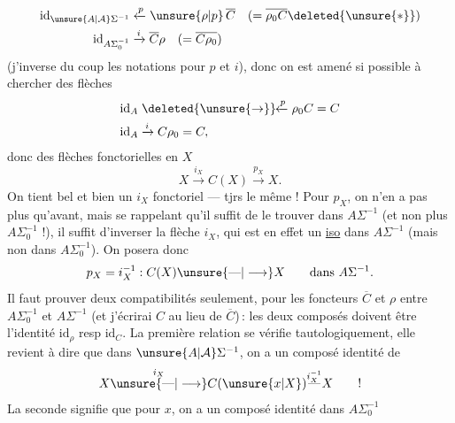 \[
 \begin{aligned}
 \mathrm{id}_{\unsure{A|\mathcal A}\Sigma^{-1}}&\xleftarrow{p}\unsure{\rho|p}\,\overline C\quad(=\overline{\rho_0 C}\deleted{\unsure{*}})\\
 \mathrm{id}_{A\Sigma_0^{-1}}&\xrightarrow{i}\overline C\rho\quad(=\overline{C\rho_0})
 \end{aligned}
\]
(j'inverse du coup les notations pour $p$ et $i$), donc on est amené si possible à chercher des flèches
\[
 \begin{aligned}
 \mathrm{id}_A&\mathrel{\deleted{\unsure{\rightarrow}}\!\!\xleftarrow{p}}\rho_0 C=C\\
 \mathrm{id}_A&\xrightarrow{i}C\rho_0=C,
 \end{aligned}
\]
donc des flèches fonctorielles en $X$
\[
 X\xrightarrow{i_X}C(X)\xrightarrow{p_X}X.
\]
On tient bel et bien un  $i_X$ fonctoriel --- tjrs le même ! Pour $p_X$, on n'en a pas plus qu'avant, mais se rappelant qu'il suffit de le trouver dans $A\Sigma^{-1}$ (et non plus $A\Sigma_0^{-1}$ !), il suffit d'inverser la flèche $i_X$, qui est en effet un \uline{iso} dans $A\Sigma^{-1}$ (mais non dans $A\Sigma_0^{-1}$). On posera donc
\[
 p_X=i_X^{-1}:C(X)\unsure{\text{---}|\longrightarrow}X\qquad\text{dans }A\Sigma^{-1}.
\]
Il faut prouver deux compatibilités seulement, pour les foncteurs $\overline C$ et $\rho$ entre $A\Sigma_0^{-1}$ et $A\Sigma^{-1}$ (et j'écrirai $C$ au lieu de $\overline C$)\,: les deux composés
doivent être l'identité $\mathrm{id}_{\rho}$ resp $\mathrm{id}_C$.
La première relation se vérifie tautologiquement, elle revient à dire que dans $\unsure{A|\mathcal A}\Sigma^{-1}$, on a un composé identité de
\[
 X\overset{i_X}{\unsure{\text{---}|\longrightarrow}}C(\unsure{x|X})\overset{i_X^{-1}}{\text{---}}X\qquad !
\]
La seconde signifie que pour  $x$, on a un composé identité dans $A\Sigma_0^{-1}$
